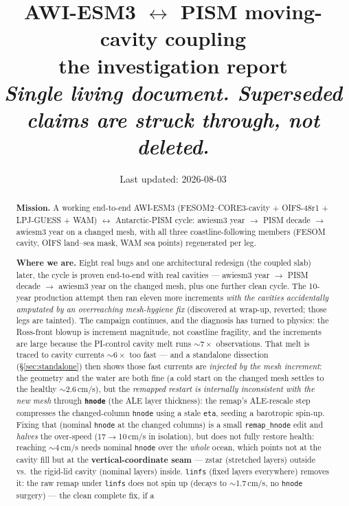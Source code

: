 \documentclass[11pt,a4paper]{article}
\title{\vspace{-1.5em}\textbf{AWI-ESM3 $\leftrightarrow$ PISM moving-cavity coupling}\\[0.3em]
       \large the investigation report\\[0.4em]
       \normalsize\textit{Single living document. Superseded claims are struck through, not deleted.}}
\author{}
\date{Last updated: 2026-08-03}
\newcommand{\code}[1]{\texttt{\small #1}}
\begin{document}
\maketitle
\vspace{-2em}

\begin{abstract}
\noindent
\textbf{Mission.} A working end-to-end AWI-ESM3 (FESOM2--CORE3-cavity + OIFS-48r1 + LPJ-GUESS + WAM)
$\leftrightarrow$ Antarctic-PISM cycle: awiesm3 year $\to$ PISM decade $\to$ awiesm3 year on a changed
mesh, with all three coastline-following members (FESOM cavity, OIFS land--sea mask, WAM sea points)
regenerated per leg.

\medskip\noindent
\textbf{Where we are.} Eight real bugs and one architectural redesign (the coupled slab)
later, the cycle is proven end-to-end with real cavities --- awiesm3 year $\to$ PISM decade
$\to$ awiesm3 year on the changed mesh, plus one further clean cycle. The 10-year production
attempt then ran eleven more increments \emph{with the cavities accidentally amputated by an
overreaching mesh-hygiene fix} (discovered at wrap-up, reverted; those legs are tainted).
The campaign continues, and the diagnosis has turned to physics: the Ross-front blowup is
increment magnitude, not coastline fragility, and the increments are large because the
PI-control cavity melt runs $\sim7\times$ observations. That melt is traced to cavity
currents $\sim6\times$ too fast --- and a standalone dissection (\S\ref{sec:standalone})
then shows those fast currents are \emph{injected by the mesh increment}: the geometry and
the water are both fine (a cold start on the changed mesh settles to the healthy
$\sim$2.6\,cm/s), but the \emph{remapped restart is internally inconsistent with the new
mesh} through \textbf{\code{hnode}} (the ALE layer thickness): the remap's ALE-rescale step
compresses the changed-column \code{hnode} using a stale \code{eta}, seeding a barotropic
spin-up. Fixing that (nominal \code{hnode} at the changed columns) is a small
\code{remap\_hnode} edit and \emph{halves} the over-speed (17$\to$10\,cm/s in isolation), but
does not fully restore health: reaching $\sim$4\,cm/s needs nominal \code{hnode} over the
\emph{whole} ocean, which points not at the cavity fill but at the \textbf{vertical-coordinate
seam} --- zstar (stretched layers) outside vs.\ the rigid-lid cavity (nominal layers) inside.
\code{linfs} (fixed layers everywhere) removes it: the raw remap under \code{linfs} does not
spin up (decays to $\sim$1.7\,cm/s, no \code{hnode} surgery) --- the clean complete fix, if a

\end{abstract}
\end{document}
